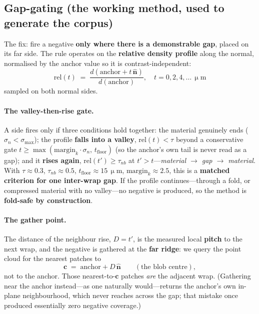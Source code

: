 \documentclass[10pt,twocolumn,a4paper]{article}
\newcommand{\um}{\ensuremath{\,\upmu\mathrm{m}}}      %
\newcommand{\nhat}{\ensuremath{\hat{\mathbf{n}}}}
\begin{document}
\subsection{Gap-gating (the working method, used to generate the corpus)}
The fix: fire a negative \textbf{only where there is a demonstrable gap}, placed
on its far side. The rule operates on the \textbf{relative density profile} along
the normal, normalised by the anchor value so it is contrast-independent:
\begin{equation}
  \mathrm{rel}(t) \;=\; \frac{d(\text{anchor}+t\,\nhat)}{d(\text{anchor})},
  \quad t=0,2,4,\dots\um
\end{equation}
sampled on both normal sides.

\paragraph{The valley-then-rise gate.} A side fires only if three conditions hold
together: the material genuinely ends ($\sigma_n<\sigma_{\max}$); the profile
\textbf{falls into a valley}, $\mathrm{rel}(t)<\tau$ beyond a conservative gate
$t\ge\max(\mathrm{margin}_k\cdot\sigma_n,\,t_{\text{floor}})$ (so the anchor's own
tail is never read as a gap); and it \textbf{rises again},
$\mathrm{rel}(t')\ge\tau_{nb}$ at $t'>t$---\emph{material $\to$ gap $\to$
material}. With $\tau\approx0.3$, $\tau_{nb}\approx0.5$,
$t_{\text{floor}}\approx15$\um, $\mathrm{margin}_k\approx2.5$, this is a
\textbf{matched criterion for one inter-wrap gap}. If the profile continues---through
a fold, or compressed material with no valley---no negative is produced, so the
method is \textbf{fold-safe by construction}.

\paragraph{The gather point.} The distance of the neighbour rise, $D=t'$, is the
measured local \textbf{pitch} to the next wrap, and the negative is gathered at
the \textbf{far ridge}: we query the point cloud for the nearest patches to
\begin{equation}
  \mathbf{c} \;=\; \text{anchor}+D\,\nhat \qquad (\text{the blob centre}),
\end{equation}
not to the anchor. Those nearest-to-$\mathbf{c}$ patches \emph{are} the adjacent
wrap. (Gathering near the anchor instead---as one naturally would---returns the
anchor's own in-plane neighbourhood, which never reaches across the gap; that
mistake once produced essentially zero negative coverage.)
\end{document}
